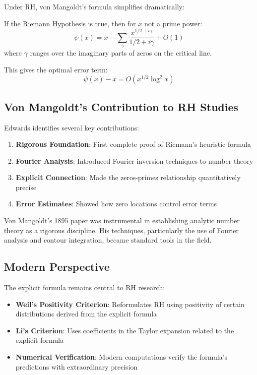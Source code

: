Under RH, von Mangoldt's formula simplifies dramatically:

\begin{theorem}
If the Riemann Hypothesis is true, then for $x$ not a prime power:
\begin{equation}
\psi(x) = x - \sum_{\gamma} \frac{x^{1/2 + i\gamma}}{1/2 + i\gamma} + O(1)
\end{equation}
where $\gamma$ ranges over the imaginary parts of zeros on the critical line.
\end{theorem}

This gives the optimal error term:
\begin{equation}
\psi(x) - x = O(x^{1/2} \log^2 x)
\end{equation}

\subsection{Von Mangoldt's Contribution to RH Studies}

Edwards \cite{edwards1974} identifies several key contributions:

\begin{enumerate}
\item \textbf{Rigorous Foundation}: First complete proof of Riemann's heuristic formula
\item \textbf{Fourier Analysis}: Introduced Fourier inversion techniques to number theory
\item \textbf{Explicit Connection}: Made the zeros-primes relationship quantitatively precise
\item \textbf{Error Estimates}: Showed how zero locations control error terms
\end{enumerate}

\begin{remark}
Von Mangoldt's 1895 paper was instrumental in establishing analytic number theory as a rigorous discipline. His techniques, particularly the use of Fourier analysis and contour integration, became standard tools in the field.
\end{remark}

\subsection{Modern Perspective}

The explicit formula remains central to RH research:

\begin{itemize}
\item \textbf{Weil's Positivity Criterion}: Reformulates RH using positivity of certain distributions derived from the explicit formula
\item \textbf{Li's Criterion}: Uses coefficients in the Taylor expansion related to the explicit formula
\item \textbf{Numerical Verification}: Modern computations verify the formula's predictions with extraordinary precision
\end{itemize}

